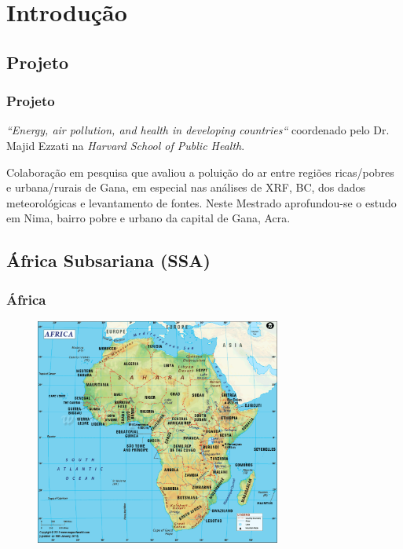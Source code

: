 \section{Introdução}

\subsection{Projeto}
\begin{frame}
  \frametitle{Projeto}
   \begin{tcolorbox}[colback=blue!5,colframe=blue!40!black,title=Projeto Internacional]
    \textit{``Energy, air pollution, and health in developing countries``}
             coordenado pelo Dr. Majid Ezzati na \textit{Harvard School of Public Health}.
   \end{tcolorbox}
   
   \begin{tcolorbox}[colback=blue!5,colframe=blue!40!black,title=Mestrado em Nima]
   	  Colaboração em pesquisa que avaliou a poluição do ar entre regiões ricas/pobres e urbana/rurais de Gana, em especial nas análises de XRF, BC, dos dados meteorológicas e levantamento de fontes. Neste Mestrado aprofundou-se o estudo em Nima, bairro pobre e urbano da capital de Gana, Acra.    
      \end{tcolorbox}
\end{frame}

\subsection{África Subsariana (SSA)}
\begin{frame}
  \frametitle{África}
  \begin{figure}[H]
    \includegraphics[width=0.72\textwidth]{../../inputs/images/africa-map.pdf}
  \end{figure}
\end{frame}

